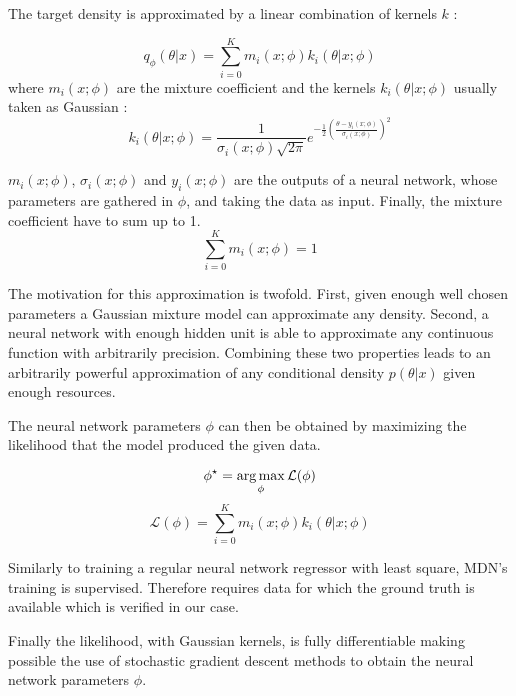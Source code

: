 The target density is approximated by a linear combination of kernels $k$ :

\begin{equation}
    q_\phi(\theta | x) = \sum_{i=0}^K m_i(x ; \phi) k_i(\theta | x ; \phi)
\end{equation}
where $m_i(x ; \phi)$ are the mixture coefficient
and the kernels $k_i(\theta | x ; \phi)$ usually taken as Gaussian :
\begin{equation}
    k_i(\theta | x ; \phi) = \frac{1}{\sigma_i(x ; \phi) \sqrt{2 \pi}} e^{- \frac{1}{2} \left ( \frac{\theta-y_i(x ; \phi)}{\sigma_i(x ; \phi)} \right )^2} 
\end{equation}

$m_i(x ; \phi)$, $\sigma_i(x ; \phi)$ and $y_i(x ; \phi)$ are the outputs of a neural network, whose parameters are gathered in $\phi$, and taking the data as input.
Finally, the mixture coefficient have to sum up to 1.
\begin{equation}
    \sum_{i=0}^K m_i(x ; \phi) =  1
\end{equation}

The motivation for this approximation is twofold.
First, given enough well chosen parameters a Gaussian mixture model can approximate any density.
Second, a neural network with enough hidden unit is able to approximate any continuous function with arbitrarily precision.
Combining these two properties leads to an arbitrarily powerful approximation of any conditional density $p(\theta|x)$ given enough resources.

The neural network parameters $\phi$ can then be obtained by maximizing the likelihood that the model produced the given data.

\begin{equation}
    \phi^\star = \operatorname*{arg\,max}_\phi \mathcal L (\phi)
\end{equation}
\begin{equation}
    \mathcal L (\phi) = \sum_{i=0}^K m_i(x ; \phi) k_i(\theta | x ; \phi)
\end{equation}

Similarly to training a regular neural network regressor with least square, MDN's training is supervised.
Therefore requires data for which the ground truth is available which is verified in our case.

Finally the likelihood, with Gaussian kernels, is fully differentiable making possible the use of stochastic gradient descent methods to obtain the neural network parameters $\phi$.

